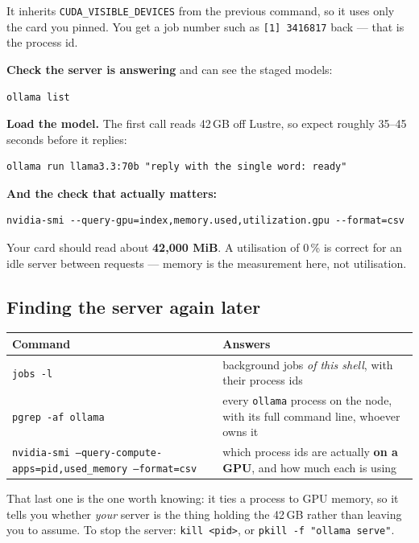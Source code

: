 \documentclass[11pt,a4paper]{article}
\begin{document}
It inherits \texttt{CUDA\_VISIBLE\_DEVICES} from the previous command, so it uses
only the card you pinned. You get a job number such as \texttt{[1] 3416817} back
--- that is the process id.

\textbf{Check the server is answering} and can see the staged models:

\begin{lstlisting}
ollama list
\end{lstlisting}

\textbf{Load the model.} The first call reads 42\,GB off Lustre, so expect
roughly 35--45 seconds before it replies:

\begin{lstlisting}
ollama run llama3.3:70b "reply with the single word: ready"
\end{lstlisting}

\textbf{And the check that actually matters:}

\begin{lstlisting}
nvidia-smi --query-gpu=index,memory.used,utilization.gpu --format=csv
\end{lstlisting}

Your card should read about \textbf{42{,}000 MiB}. A utilisation of 0\,\% is
correct for an idle server between requests --- memory is the measurement here,
not utilisation.

\subsection{Finding the server again later}

\begin{center}
\begin{tabularx}{\linewidth}{@{}l X@{}}
\toprule
\textbf{Command} & \textbf{Answers} \\
\midrule
\texttt{jobs -l} & background jobs \emph{of this shell}, with their process ids \\
\texttt{pgrep -af ollama} & every \texttt{ollama} process on the node, with its
full command line, whoever owns it \\
\texttt{nvidia-smi --query-compute-apps=pid,used\_memory --format=csv} & which
process ids are actually \textbf{on a GPU}, and how much each is using \\
\bottomrule
\end{tabularx}
\end{center}

That last one is the one worth knowing: it ties a process to GPU memory, so it
tells you whether \emph{your} server is the thing holding the 42\,GB rather than
leaving you to assume. To stop the server: \texttt{kill <pid>}, or
\texttt{pkill -f "ollama serve"}.
\end{document}
